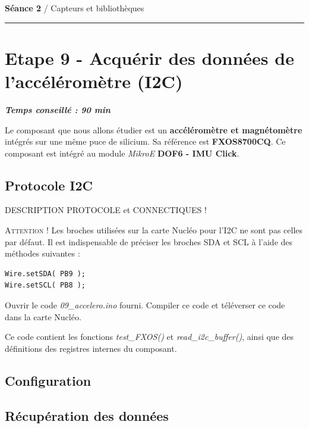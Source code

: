 \documentclass[a4paper,11pt,titlepage]{article} %
\begin{document}
{\noindent\Large \rule[-7pt]{0pt}{30pt} \textbf{Séance 2} / Capteurs et bibliothèques} 

\noindent \rule{\linewidth}{1pt}

\section{Etape 9 - Acquérir des données de l'accéléromètre (I2C)}

\begin{center} \textbf{\textit{Temps conseillé : 90 min}} \end{center}

Le composant que nous allons étudier est un \textbf{accéléromètre et magnétomètre} intégrés sur une même puce de silicium. Sa référence est \textbf{FXOS8700CQ}. Ce composant est intégré au module \textit{MikroE} \textbf{DOF6 - IMU Click}.

\subsection{Protocole I2C}

DESCRIPTION PROTOCOLE et CONNECTIQUES !

\bigskip

\textsc{Attention !} Les broches utilisées sur la carte Nucléo pour l'I2C ne sont pas celles par défaut. Il est indispensable de préciser les broches SDA et SCL à l'aide des méthodes suivantes :

\begin{lstlisting}
Wire.setSDA( PB9 );    
Wire.setSCL( PB8 ); 
\end{lstlisting}

\bigskip

\Manip Ouvrir le code \textsl{09\_accelero.ino} fourni. Compiler ce code et téléverser ce code dans la carte Nucléo.

Ce code contient les fonctions \textsl{test\_FXOS()} et \textsl{read\_i2c\_buffer()}, ainsi que des définitions des registres internes du composant.

\Manip 

\subsection{Configuration}


\subsection{Récupération des données}
\end{document}
